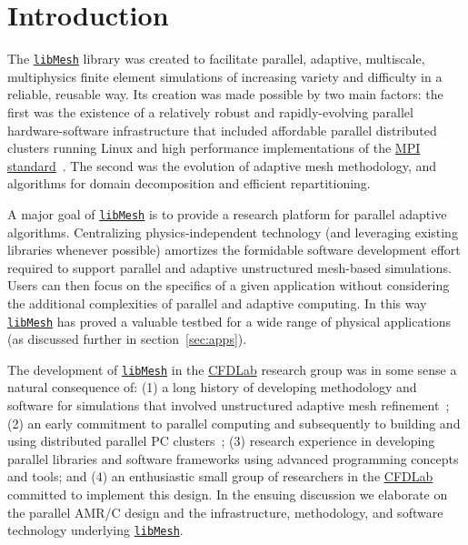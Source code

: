 \documentclass[global,twocolumn,final]{svjour}
\newcommand{\libMesh}{\href{http://libmesh.sourceforge.net}{\texttt{lib\-Mesh}}}
\newcommand{\CFDLab}{\href{http://cfdlab.ae.utexas.edu}{CFDLab}}
\begin{document}
\section{Introduction\label{intro}}
The \libMesh{} library was created to facilitate parallel,
adaptive, multiscale, multiphysics finite element simulations of
increasing variety and difficulty in a reliable, reusable way.  Its creation
was made possible by two main factors: the first was the existence of a
relatively robust and rapidly-evolving parallel hardware-software
infrastructure that included affordable parallel distributed clusters
running Linux and high performance implementations of the
\href{http://www.mpi-forum.org}{MPI standard}~\cite{mpich}.  The
second was the evolution of adaptive mesh methodology, and algorithms
for domain decomposition and efficient repartitioning.

A major goal of \libMesh{} is to provide a research platform for
parallel adaptive algorithms.  Centralizing physics-independent
technology (and leveraging existing libraries wh\-enever possible)
amortizes the formidable software development effort required to
support parallel and adaptive unstructured mesh-based simulations.
Users can then focus on the specifics of a given application without
considering the additional complexities of parallel and adaptive
computing.  In this way \libMesh{} has proved a valuable testbed for a
wide range of physical applications (as discussed further in
section~\ref{sec:apps}).

The development of \libMesh{} in the \CFDLab{} research group was in
some sense a natural consequence of: (1) a long history of developing
methodology and software for simulations that involved unstructured
adaptive mesh refinement~\cite{carey_gridbook}; (2) an early
commitment to parallel computing and subsequently to building and
using distributed parallel PC clusters~\cite{barth03cluster}; (3)
research experience in developing parallel libraries and software
frameworks using advanced programming concepts and tools; and (4) an
enthusiastic small group of researchers in the \CFDLab{} committed to
implement this design.  In the ensuing discussion we elaborate
on the parallel AMR/C design and the infrastructure, methodology, and
software technology underlying \libMesh.
\end{document}
